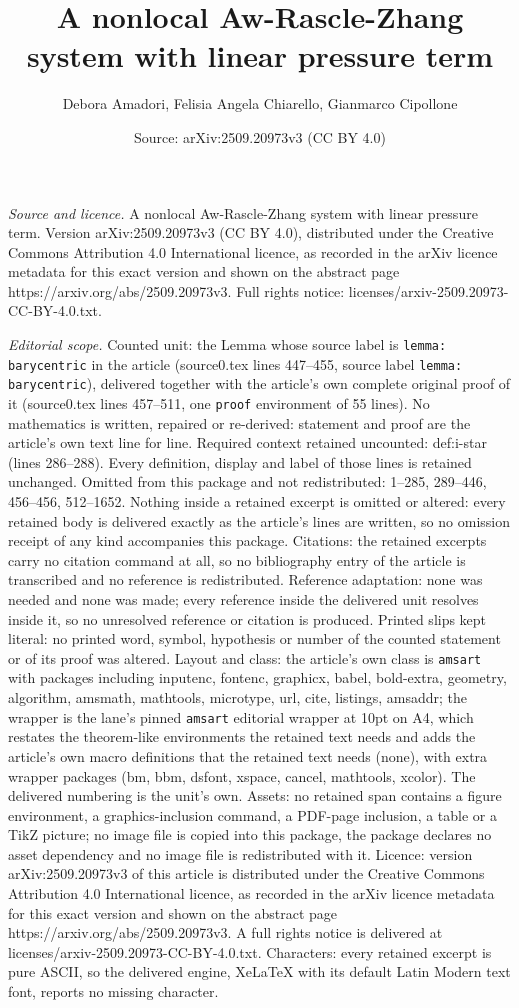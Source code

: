 \documentclass[10pt,a4paper]{amsart}
\title[A nonlocal Aw-Rascle-Zhang system with linear pressure term]{A nonlocal Aw-Rascle-Zhang system with linear pressure term}
\author{Debora Amadori, Felisia Angela Chiarello, Gianmarco Cipollone}
\date{Source: arXiv:2509.20973v3 (CC BY 4.0)}
\begin{document}
\maketitle

\noindent\emph{Source and licence.} A nonlocal Aw-Rascle-Zhang system with linear pressure term. Version arXiv:2509.20973v3 (CC BY 4.0), distributed under the Creative Commons Attribution 4.0 International licence, as recorded in the arXiv licence metadata for this exact version and shown on the abstract page https://arxiv.org/abs/2509.20973v3. Full rights notice: licenses/arxiv-2509.20973-CC-BY-4.0.txt.\par\smallskip

\noindent\textit{Editorial scope.} Counted unit: the Lemma whose source label is \texttt{lemma: barycentric} in the article (source0.tex lines 447--455, source label \texttt{lemma: barycentric}), delivered together with the article's own complete original proof of it (source0.tex lines 457--511, one \texttt{proof} environment of 55 lines). No mathematics is written, repaired or re-derived: statement and proof are the article's own text line for line. Required context retained uncounted: def:i-star (lines 286--288). Every definition, display and label of those lines is retained unchanged. Omitted from this package and not redistributed: 1--285, 289--446, 456--456, 512--1652. Nothing inside a retained excerpt is omitted or altered: every retained body is delivered exactly as the article's lines are written, so no omission receipt of any kind accompanies this package. Citations: the retained excerpts carry no citation command at all, so no bibliography entry of the article is transcribed and no reference is redistributed. Reference adaptation: none was needed and none was made; every reference inside the delivered unit resolves inside it, so no unresolved reference or citation is produced. Printed slips kept literal: no printed word, symbol, hypothesis or number of the counted statement or of its proof was altered. Layout and class: the article's own class is \texttt{amsart} with packages including inputenc, fontenc, graphicx, babel, bold-extra, geometry, algorithm, amsmath, mathtools, microtype, url, cite, listings, amsaddr; the wrapper is the lane's pinned \texttt{amsart} editorial wrapper at 10pt on A4, which restates the theorem-like environments the retained text needs and adds the article's own macro definitions that the retained text needs (none), with extra wrapper packages (bm, bbm, dsfont, xspace, cancel, mathtools, xcolor). The delivered numbering is the unit's own. Assets: no retained span contains a figure environment, a graphics-inclusion command, a PDF-page inclusion, a table or a TikZ picture; no image file is copied into this package, the package declares no asset dependency and no image file is redistributed with it. Licence: version arXiv:2509.20973v3 of this article is distributed under the Creative Commons Attribution 4.0 International licence, as recorded in the arXiv licence metadata for this exact version and shown on the abstract page https://arxiv.org/abs/2509.20973v3. A full rights notice is delivered at licenses/arxiv-2509.20973-CC-BY-4.0.txt. Characters: every retained excerpt is pure ASCII, so the delivered engine, XeLaTeX with its default Latin Modern text font, reports no missing character.
\end{document}
